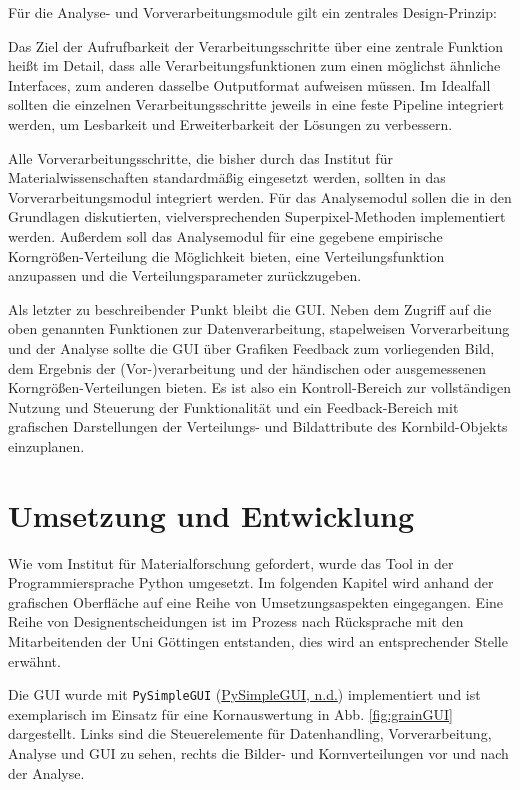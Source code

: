 \documentclass[
  12pt,
  openany]{book}
\begin{document}
Für die Analyse- und Vorverarbeitungsmodule gilt ein zentrales Design-Prinzip:

Das Ziel der Aufrufbarkeit der Verarbeitungsschritte über eine zentrale Funktion heißt im Detail, dass alle Verarbeitungsfunktionen zum einen möglichst ähnliche Interfaces, zum anderen dasselbe Outputformat aufweisen müssen. Im Idealfall sollten die einzelnen Verarbeitungsschritte jeweils in eine feste Pipeline integriert werden, um Lesbarkeit und Erweiterbarkeit der Lösungen zu verbessern.

Alle Vorverarbeitungsschritte, die bisher durch das Institut für Materialwissenschaften standardmäßig eingesetzt werden, sollten in das Vorverarbeitungsmodul integriert werden. Für das Analysemodul sollen die in den Grundlagen diskutierten, vielversprechenden Superpixel-Methoden implementiert werden. Außerdem soll das Analysemodul für eine gegebene empirische Korngrößen-Verteilung die Möglichkeit bieten, eine Verteilungsfunktion anzupassen und die Verteilungsparameter zurückzugeben.

Als letzter zu beschreibender Punkt bleibt die GUI. Neben dem Zugriff auf die oben genannten Funktionen zur Datenverarbeitung, stapelweisen Vorverarbeitung und der Analyse sollte die GUI über Grafiken Feedback zum vorliegenden Bild, dem Ergebnis der (Vor-)verarbeitung und der händischen oder ausgemessenen Korngrößen-Verteilungen bieten. Es ist also ein Kontroll-Bereich zur vollständigen Nutzung und Steuerung der Funktionalität und ein Feedback-Bereich mit grafischen Darstellungen der Verteilungs- und Bildattribute des Kornbild-Objekts einzuplanen.

\hypertarget{umsetzung-und-entwicklung}{%
\chapter{Umsetzung und Entwicklung}\label{umsetzung-und-entwicklung}}

Wie vom Institut für Materialforschung gefordert, wurde das Tool in der Programmiersprache Python umgesetzt.
Im folgenden Kapitel wird anhand der grafischen Oberfläche auf eine Reihe von Umsetzungsaspekten eingegangen. Eine Reihe von Designentscheidungen ist im Prozess nach Rücksprache mit den Mitarbeitenden der Uni Göttingen entstanden, dies wird an entsprechender Stelle erwähnt.

Die GUI wurde mit \texttt{PySimpleGUI} (\protect\hyperlink{ref-pysimpleguiPySimpleGUIPythonGUIs}{PySimpleGUI, n.d.}) implementiert und ist exemplarisch im Einsatz für eine Kornauswertung in Abb. \ref{fig:grainGUI} dargestellt. Links sind die Steuerelemente für Datenhandling, Vorverarbeitung, Analyse und GUI zu sehen, rechts die Bilder- und Kornverteilungen vor und nach der Analyse.
\end{document}
